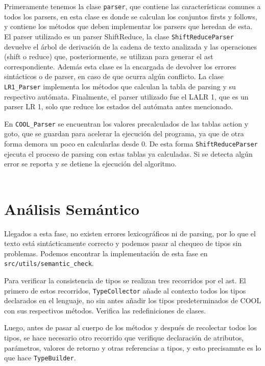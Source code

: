 \documentclass[twoside]{article}
\begin{document}
Primeramente tenemos la clase \texttt{parser}, que contiene las caracter\'isticas comunes a todos los parsers, en esta clase es donde se calculan los conjuntos firsts y follows, y contiene los m\'etodos que deben implementar los parsers que heredan de esta. El parser utilizado es un parser ShiftReduce, la clase \texttt{ShiftReduceParser} devuelve el \'arbol de derivaci\'on de la cadena de texto analizada y las operaciones (shift o reduce) que, posteriormente, se utilizan para generar el ast correspondiente. Adem\'as esta clase es la encargada de devolver los errores sint\'acticos o de parser, en caso de que ocurra alg\'un conflicto. La clase \texttt{LR1\_Parser} implementa los m\'etodos que calculan la tabla de parsing y su respectivo aut\'omata. Finalmente, el parser utilizado fue el LALR 1, que es un parser LR 1, solo que reduce los estados del aut\'omata antes mencionado.

En \texttt{COOL\_Parser} se encuentran los valores precalculados de las tablas action y goto, que se guardan para acelerar la ejecuci\'on del programa, ya que de otra forma demora un poco en calcularlas desde 0. De esta forma \texttt{ShiftReduceParser} ejecuta el proceso de parsing con estas tablas ya calculadas. Si se detecta alg\'un error se reporta y se detiene la ejecuci\'on del algoritmo.\\\\


\section{An\'alisis Sem\'antico}
Llegados a esta fase, no existen errores lexicogr\'aficos ni de parsing, por lo que el texto est\'a sint\'acticamente correcto y podemos pasar al chequeo de tipos sin problemas. Podemos encontrar la implementaci\'on de esta fase en \texttt{src/utils/semantic\_check}.

Para verificar la consistencia de tipos se realizan tres recorridos por el ast. El primero de estos recorridos, \texttt{TypeCollector} a\~nade al contexto todos los tipos declarados en el lenguaje, no sin antes a\~nadir los tipos predeterminados de COOL con sus respectivos m\'etodos. Verifica las redefiniciones de clases.

Luego, antes de pasar al cuerpo de los m\'etodos y despu\'es de recolectar todos los tipos, se hace necesario otro recorrido que verifique declaraci\'on de atributos, par\'ametros, valores de retorno y otras referencias a tipos, y esto precisamnte es lo que hace \texttt{TypeBuilder}. 
\end{document}

